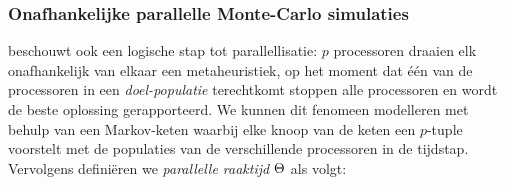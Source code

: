 \subsubsection{Onafhankelijke parallelle Monte-Carlo simulaties}

\cite{DBLP:journals/jc/ShonkwilerV94} beschouwt ook een logische stap tot parallellisatie: $p$ processoren draaien elk onafhankelijk van elkaar een metaheuristiek, op het moment dat \'e\'en van de processoren in een \emph{doel-populatie} terechtkomt stoppen alle processoren en wordt de beste oplossing gerapporteerd. We kunnen dit fenomeen modelleren met behulp van een Markov-keten waarbij elke knoop van de keten een $p$-tuple voorstelt met de populaties van de verschillende processoren in de tijdstap. Vervolgens defini\"eren we \emph{parallelle raaktijd} $\Theta$ als volgt:

